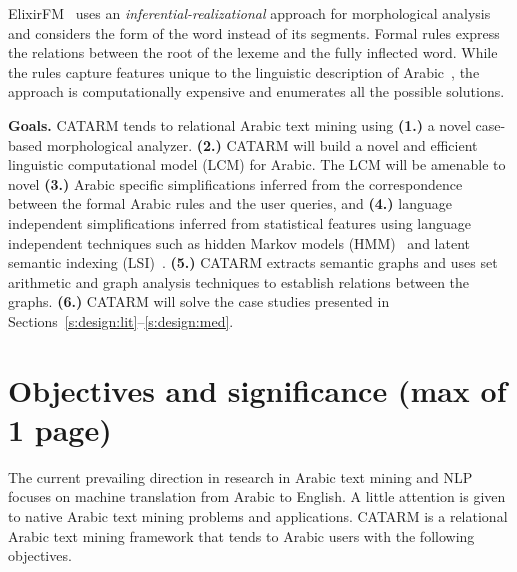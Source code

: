 \documentclass[12pt]{article}
\newcommand{\noTrRL}[1]{\transfalse\RL{#1}\transtrue}
\begin{document}
ElixirFM~\cite{Otakar:07} uses an {\em inferential-realizational}
approach for morphological analysis
and considers the form of the word 
\noTrRL{.sarf}  instead of its segments. 
Formal rules express the relations between 
the root of the lexeme and the fully inflected word. 
While the rules capture features unique to 
the linguistic description of Arabic~\cite{Badawi:04},
the approach is computationally expensive and enumerates 
all the possible solutions. 

{\bf Goals.} 
CATARM tends to relational Arabic text mining using 
{\bf (1.)} a novel case-based morphological analyzer.
{\bf (2.)} CATARM will build a novel and efficient 
linguistic computational model (LCM) for Arabic. 
The LCM will be amenable to novel 
{\bf (3.)} Arabic specific simplifications 
inferred from the correspondence between the formal Arabic rules
and the user queries, and 
{\bf (4.)} language independent simplifications
inferred from statistical features %
using language independent techniques such as 
hidden Markov models (HMM)~\cite{JanHMM06}
and latent semantic indexing (LSI)~\cite{LSI89}.
{\bf (5.)} CATARM extracts semantic graphs 
and uses set arithmetic and graph analysis techniques
to establish relations between the graphs. 
{\bf (6.)} CATARM will solve the case studies 
presented in Sections~\ref{s:design:lit}--\ref{s:design:med}.

\pagebreak

\section{Objectives and significance (max of 1 page) } 
\label{s:objectives}

The current prevailing direction in research 
in Arabic text mining and NLP focuses on machine translation from 
Arabic to English. 
A little attention is given to native Arabic text mining 
problems and applications. 
CATARM is a relational Arabic text mining 
framework that tends to Arabic users 
with the following objectives.
\end{document}
